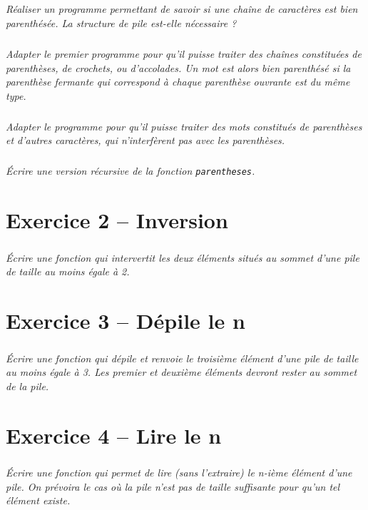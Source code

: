\subparagraph{}
\textit{Réaliser un programme permettant de savoir si une chaîne de caractères est bien parenthésée. La structure de pile est-elle nécessaire ?}
\ifprof
\begin{corrige}
\end{corrige}
\else
\fi


\subparagraph{}
\textit{Adapter le premier programme pour qu'il puisse traiter des chaînes constituées de parenthèses, de crochets, ou d'accolades. Un mot est alors bien parenthésé si la parenthèse fermante qui correspond à chaque parenthèse ouvrante est du même type.}
\ifprof
\begin{corrige}
\end{corrige}
\else
\fi

\subparagraph{}
\textit{Adapter le programme pour qu’il puisse traiter des mots constitués de parenthèses et
d’autres caractères, qui n’interfèrent pas avec les parenthèses.}
\ifprof
\begin{corrige}
\end{corrige}
\else
\fi


\subparagraph{}
\textit{Écrire une version récursive de la fonction \texttt{parentheses}.}
\ifprof
\begin{corrige}
\end{corrige}
\else
\fi


\section*{Exercice 2 -- Inversion}
\subparagraph*{}
\setcounter{exo}{0}
\textit{Écrire une fonction qui intervertit les deux éléments situés au sommet d’une pile de taille
au moins égale à 2.}
\ifprof
\begin{corrige}
\end{corrige}
\else
\fi


\section*{Exercice 3 -- Dépile le n\ieme}
\setcounter{exo}{0}
\subparagraph*{}
\textit{Écrire une fonction qui dépile et renvoie le troisième élément d’une pile de taille au moins
égale à 3. Les premier et deuxième éléments devront rester au sommet de la pile.}
\ifprof
\begin{corrige}
\end{corrige}
\else
\fi

\section*{Exercice 4 -- Lire  le n\ieme}
\setcounter{exo}{0}
\subparagraph*{}
\textit{Écrire une fonction qui permet de lire (sans l’extraire) le n-ième élément d’une pile. On
prévoira le cas où la pile n’est pas de taille suffisante pour qu’un tel élément existe.}
\ifprof
\begin{corrige}
\end{corrige}
\else
\fi


